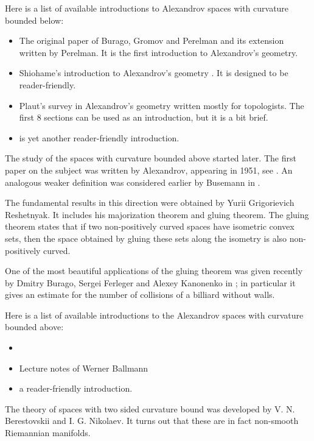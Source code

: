 Here is a list of available introductions to  Alexandrov spaces with curvature bounded below: 
\begin{itemize}
\item The original paper of Burago, Gromov and Perelman \cite{BGP} 
and its extension \cite{perelman:spaces2} written by Perelman.
It is the first introduction to Alexandrov's geometry. 
\item Shiohame's introduction to Alexandrov's geometry \cite{shiohama}.
It is designed to be reader-friendly. 
\item Plaut's survey in Alexandrov's geometry \cite{plaut:survey}
written mostly for topologists. 
The first 8 sections can be used as an introduction, but it is a bit brief.
\item \cite[Chapter 10]{BBI} is yet another reader-friendly introduction.
\end{itemize}

The study of the spaces with curvature bounded above started later.
The first paper on the subject was written by Alexandrov, appearing in 1951, see \cite{alexandrov:strong-angle}.
An analogous weaker definition was considered earlier by Busemann in \cite{busemann-CBA}.

The fundamental results in this direction were obtained by Yurii Grigorievich Reshetnyak.
It includes his majorization theorem and gluing theorem.
The gluing theorem states that if two non-positively curved spaces have isometric convex sets, then the space obtained by gluing these sets along the isometry is also non-positively curved.

One of the most beautiful applications of the gluing theorem was given  recently by Dmitry Burago, Sergei Ferleger and Alexey Kanonenko in \cite{BFK};
in particular it gives an estimate for the number of collisions of a billiard without walls.

Here is a list of available introductions to the Alexandrov spaces with curvature bounded above: 
\begin{itemize}
\item \cite{BH}
\item \cite{ballmann:lectures} Lecture notes of Werner Ballmann
\item \cite[Chapter 9]{BBI} a reader-friendly introduction.
\end{itemize}

The theory of spaces with two sided curvature bound was developed by V. N. Berestovskii and I. G. Nikolaev. It turns out that these are in fact non-smooth Riemannian manifolds. 

